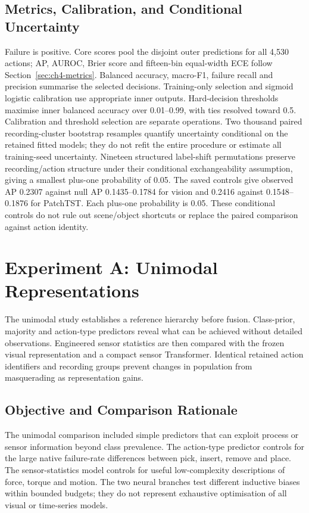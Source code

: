 \subsection{Metrics, Calibration, and Conditional Uncertainty}
Failure is positive. Core scores pool the disjoint outer predictions for all 4,530
actions; AP, AUROC, Brier score and fifteen-bin equal-width ECE follow
Section~\ref{sec:ch4-metrics}. Balanced accuracy, macro-F1, failure recall and precision
summarise the selected decisions. Training-only selection and sigmoid logistic calibration use
appropriate inner outputs. Hard-decision thresholds maximise inner balanced accuracy
over 0.01--0.99, with ties resolved toward 0.5. Calibration and threshold selection are
separate operations. Two thousand paired recording-cluster bootstrap resamples quantify
uncertainty conditional on the retained fitted models; they do not refit the entire
procedure or estimate all training-seed uncertainty. Nineteen structured label-shift
permutations preserve recording/action structure under their conditional exchangeability
assumption, giving a smallest plus-one probability of 0.05. The saved controls give observed AP
0.2307 against null AP 0.1435--0.1784 for vision and 0.2416 against 0.1548--0.1876
for PatchTST. Each plus-one probability is 0.05. These conditional controls do not rule
out scene/object shortcuts or replace the paired comparison against action identity.

\section{Experiment A: Unimodal Representations}
The unimodal study establishes a reference hierarchy before fusion. Class-prior,
majority and action-type predictors reveal what can be achieved without detailed
observations. Engineered sensor statistics are then compared with the frozen visual
representation and a compact sensor Transformer. Identical retained action identifiers
and recording groups prevent changes in population from masquerading as representation
gains.

\subsection{Objective and Comparison Rationale}
The unimodal comparison included simple predictors that can exploit process or sensor
information beyond class prevalence. The action-type predictor controls for the large
native failure-rate differences between pick, insert, remove and place. The
sensor-statistics model controls for useful low-complexity descriptions of force, torque
and motion. The two neural branches test different inductive biases within bounded
budgets; they do not represent exhaustive optimisation of all visual or time-series
models.

